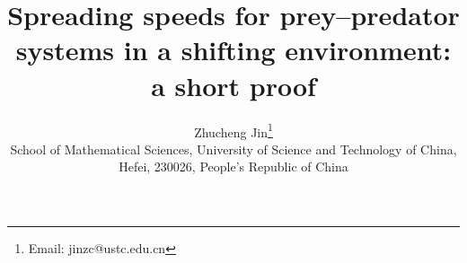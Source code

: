 \documentclass[10pt]{article}
\numberwithin{equation}{section}
\begin{document}

\title{Spreading speeds for  prey--predator systems in a shifting environment: a short proof}






\author{ Zhucheng Jin\footnote{Email: jinzc@ustc.edu.cn} \\
 School of Mathematical Sciences, University of Science and Technology of China, \\
  Hefei, 230026, People's Republic of China \\
}

\maketitle




\end{document}
